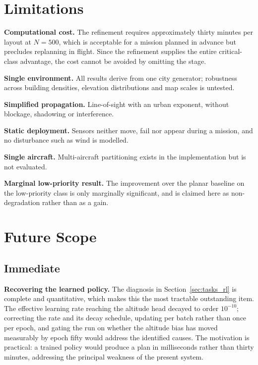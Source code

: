 \section{Limitations}

\textbf{Computational cost.} The refinement requires approximately thirty minutes per layout at $N = 500$, which is acceptable for a mission planned in advance but precludes replanning in flight. Since the refinement supplies the entire critical-class advantage, the cost cannot be avoided by omitting the stage.

\textbf{Single environment.} All results derive from one city generator; robustness across building densities, elevation distributions and map scales is untested.

\textbf{Simplified propagation.} Line-of-sight with an urban exponent, without blockage, shadowing or interference.

\textbf{Static deployment.} Sensors neither move, fail nor appear during a mission, and no disturbance such as wind is modelled.

\textbf{Single aircraft.} Multi-aircraft partitioning exists in the implementation but is not evaluated.

\textbf{Marginal low-priority result.} The improvement over the planar baseline on the low-priority class is only marginally significant, and is claimed here as non-degradation rather than as a gain.

\section{Future Scope}

\subsection{Immediate}

\textbf{Recovering the learned policy.} The diagnosis in Section~\ref{sec:tasks_rl} is complete and quantitative, which makes this the most tractable outstanding item. The effective learning rate reaching the altitude head decayed to order $10^{-10}$; correcting the rate and its decay schedule, updating per batch rather than once per epoch, and gating the run on whether the altitude bias has moved measurably by epoch fifty would address the identified causes. The motivation is practical: a trained policy would produce a plan in milliseconds rather than thirty minutes, addressing the principal weakness of the present system.

